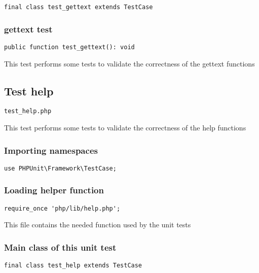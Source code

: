 \documentclass[a4paper]{article}
\begin{document}
\begin{lstlisting}
final class test_gettext extends TestCase
\end{lstlisting}

\hypertarget{toc202}{}
\subsubsection{gettext test}

\begin{lstlisting}
public function test_gettext(): void
\end{lstlisting}

This test performs some tests to validate the correctness
of the gettext functions

\hypertarget{toc203}{}
\subsection{Test help}

\begin{lstlisting}
test_help.php
\end{lstlisting}

This test performs some tests to validate the correctness
of the help functions

\hypertarget{toc204}{}
\subsubsection{Importing namespaces}

\begin{lstlisting}
use PHPUnit\Framework\TestCase;
\end{lstlisting}

\hypertarget{toc205}{}
\subsubsection{Loading helper function}

\begin{lstlisting}
require_once 'php/lib/help.php';
\end{lstlisting}

This file contains the needed function used by the unit tests

\hypertarget{toc206}{}
\subsubsection{Main class of this unit test}

\begin{lstlisting}
final class test_help extends TestCase
\end{lstlisting}
\end{document}
